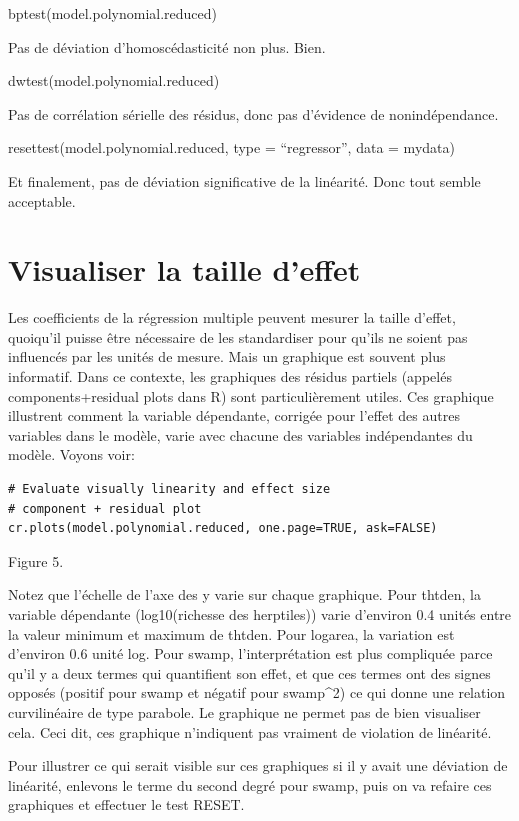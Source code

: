 \documentclass[12pt,]{book}
\begin{document}
bptest(model.polynomial.reduced)

Pas de déviation d'homoscédasticité non plus. Bien.

dwtest(model.polynomial.reduced)

Pas de corrélation sérielle des résidus, donc pas d'évidence de nonindépendance.

resettest(model.polynomial.reduced, type = ``regressor'', data = mydata)

Et finalement, pas de déviation significative de la linéarité. Donc tout semble acceptable.

\hypertarget{visualiser-la-taille-deffet}{%
\section{Visualiser la taille d'effet}\label{visualiser-la-taille-deffet}}

Les coefficients de la régression multiple peuvent mesurer la taille d'effet, quoiqu'il puisse être nécessaire de les standardiser pour qu'ils ne soient pas influencés par les unités de mesure. Mais un graphique est souvent plus informatif. Dans ce contexte, les graphiques des résidus partiels (appelés components+residual plots dans R) sont particulièrement utiles. Ces graphique illustrent comment la variable dépendante, corrigée pour l'effet des autres variables dans le modèle, varie avec chacune des variables indépendantes du modèle. Voyons voir:

\begin{verbatim}
# Evaluate visually linearity and effect size
# component + residual plot
cr.plots(model.polynomial.reduced, one.page=TRUE, ask=FALSE)
\end{verbatim}

Figure 5.

Notez que l'échelle de l'axe des y varie sur chaque graphique. Pour thtden, la variable dépendante (log10(richesse des herptiles)) varie d'environ 0.4 unités entre la valeur minimum et maximum de thtden. Pour logarea, la variation est d'environ 0.6 unité log. Pour swamp, l'interprétation est plus compliquée parce qu'il y a deux termes qui quantifient son effet, et que ces termes ont des signes opposés (positif pour swamp et négatif pour swamp\^{}2) ce qui donne une relation curvilinéaire de type parabole. Le graphique ne permet pas de bien visualiser cela. Ceci dit, ces graphique n'indiquent pas vraiment de violation de linéarité.

Pour illustrer ce qui serait visible sur ces graphiques si il y avait une déviation de linéarité, enlevons le terme du second degré pour swamp, puis on va refaire ces graphiques et effectuer le test RESET.
\end{document}
